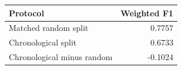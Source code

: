 \begin{tabular}{lr}
\toprule
Protocol & Weighted F1 \\
\midrule
Matched random split & 0.7757 \\
Chronological split & 0.6733 \\
Chronological minus random & -0.1024 \\
\bottomrule
\end{tabular}
